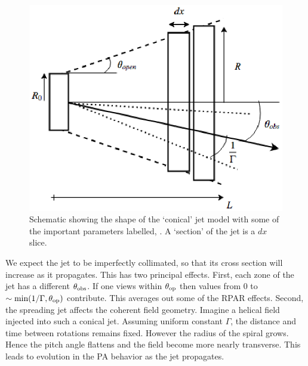 \begin{figure}[t]
\label{fig:f6}
\includegraphics[width=0.8\linewidth]{figures/f6.eps}
\centering
\caption{Schematic showing the shape of the `conical' jet model with some of the important parameters labelled, \citep{potter_black_2013}. A `section' of the jet is a $dx$ slice.}
\end{figure}

We expect the jet to be imperfectly collimated, so that its cross section will increase as it propagates. This has two principal effects. First, each zone of the jet has a different $\theta_{\rm obs}$. If one views within $\theta_{\rm op}$ then values from 0 to $\sim {\rm min ({1/\Gamma},\theta_{\rm op})}$ contribute. This averages out some of the RPAR effects. Second, the spreading jet affects the coherent field geometry. Imagine a helical field injected into such a conical jet. Assuming uniform constant $\Gamma$, the distance and time between rotations remains fixed. However the radius of the spiral grows. Hence the pitch angle flattens and the field become more nearly transverse. This leads to evolution in the PA behavior as the jet propagates.

